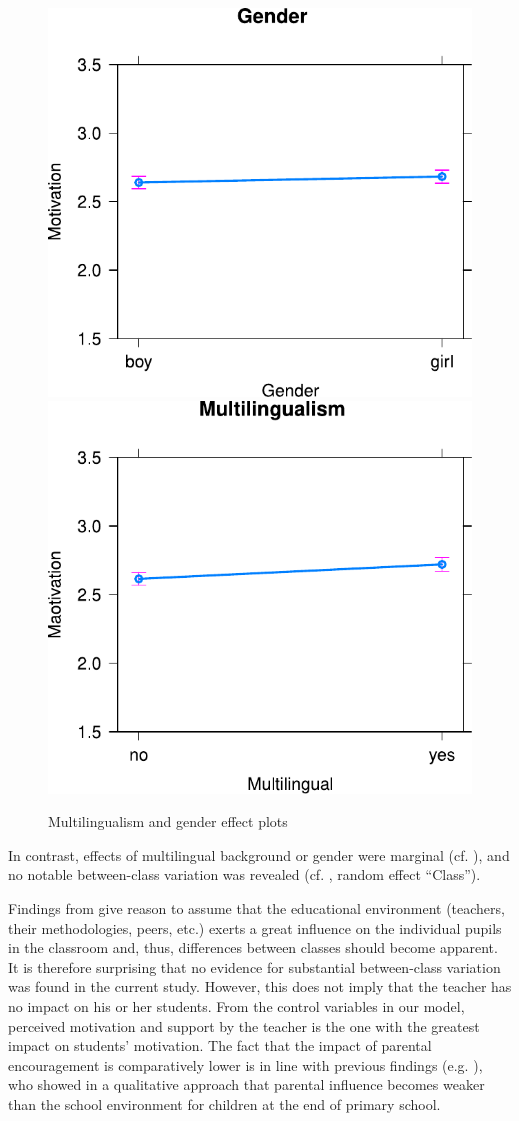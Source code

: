 \documentclass[output=paper]{langsci/langscibook}
\begin{document}
\begin{figure}
\includegraphics[width=.45\textwidth]{figures/Fig7.4.1.pdf}\hfill%
\includegraphics[width=.45\textwidth]{figures/Fig7.4.2.pdf}
\caption{Multilingualism and gender effect plots\label{fig:07:4}}
\end{figure}

In contrast, effects of multilingual background or gender were marginal (cf. ), and no notable between-class variation was revealed (cf. , random effect ``Class''). 

Findings from \citet{PfenningerSingleton2016} give reason to assume that the educational environment (teachers, their methodologies, peers, etc.) exerts a great influence on the individual pupils in the classroom and, thus, differences between classes should become apparent. It is therefore surprising that no evidence for substantial between-class variation was found in the current study. However, this does not imply that the teacher has no impact on his or her students. From the control variables in our model, perceived motivation and support by the teacher is the one with the greatest impact on students’ motivation. The fact that the impact of parental encouragement is comparatively lower is in line with previous findings (e.g. \citealt{Holder2005}), who showed in a qualitative approach that parental influence becomes weaker than the school environment for children at the end of primary school. 
\end{document}
